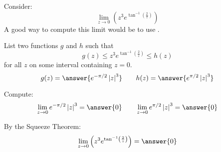 \documentclass{ximera}
\author{Bart Snapp}
\begin{document}
\begin{exercise}


Consider:
\[
\lim_{z\to 0} \left(z^3 e^{\tan ^{-1}\left(\frac{2}{z}\right)}\right)
\]
A good way to compute this limit would be to use .
\begin{exercise}
List two functions $g$ and $h$ such that
\[
g(z)\le z^3 e^{\tan ^{-1}\left(\frac{2}{z}\right)} \le h(z)
\]
for all $z$ on some interval containing $z=0$.
\[
g(z)=\answer{e^{-\pi /2} \left| z\right| ^3}\qquad h(z) =\answer{e^{\pi /2} \left| z\right| ^3}
\]
\begin{exercise}
Compute:
\[
\lim_{z \to 0}e^{-\pi /2} \left| z\right| ^3 = \answer{0}\qquad \lim_{z\to 0}e^{\pi /2} \left| z\right| ^3 = \answer{0}
\]
\begin{exercise}
By the Squeeze Theorem:
\[
\lim_{z\to 0} \left(z^3 e^{\tan ^{-1}\left(\frac{2}{z}\right)}\right) = \answer{0}
\]
\end{exercise}
\end{exercise}
\end{exercise}
\end{exercise}
\end{document}
